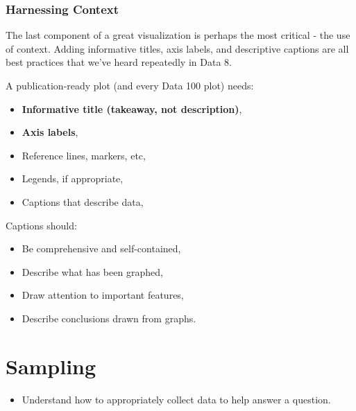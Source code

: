 \documentclass[
  letterpaper,
  DIV=11,
  numbers=noendperiod]{scrreprt}
\providecommand{\tightlist}{%
  \setlength{\itemsep}{0pt}\setlength{\parskip}{0pt}}\usepackage{longtable,booktabs,array}
\begin{document}
\subsection{Harnessing Context}\label{harnessing-context}

The last component of a great visualization is perhaps the most critical
- the use of context. Adding informative titles, axis labels, and
descriptive captions are all best practices that we've heard repeatedly
in Data 8.

A publication-ready plot (and every Data 100 plot) needs:

\begin{itemize}
\tightlist
\item
  \textbf{Informative title (takeaway, not description)},
\item
  \textbf{Axis labels},
\item
  Reference lines, markers, etc,
\item
  Legends, if appropriate,
\item
  Captions that describe data,
\end{itemize}

Captions should:

\begin{itemize}
\tightlist
\item
  Be comprehensive and self-contained,
\item
  Describe what has been graphed,
\item
  Draw attention to important features,
\item
  Describe conclusions drawn from graphs.
\end{itemize}


\chapter{Sampling}\label{sampling}

\begin{tcolorbox}[enhanced jigsaw, titlerule=0mm, bottomtitle=1mm, arc=.35mm, colframe=quarto-callout-note-color-frame, rightrule=.15mm, opacityback=0, opacitybacktitle=0.6, leftrule=.75mm, breakable, toprule=.15mm, colback=white, left=2mm, colbacktitle=quarto-callout-note-color!10!white, toptitle=1mm, bottomrule=.15mm, title=\textcolor{quarto-callout-note-color}{\faInfo}\hspace{0.5em}{Learning Outcomes}, coltitle=black]

\begin{itemize}
\tightlist
\item
  Understand how to appropriately collect data to help answer a
  question.
\end{itemize}

\end{tcolorbox}
\end{document}
